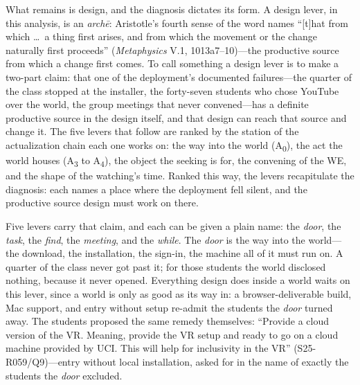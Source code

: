 What remains is design, and the diagnosis dictates its form. A design
lever, in this analysis, is an \textit{archē}: Aristotle's fourth
sense of the word names ``[t]hat from which \ldots\ a thing first
arises, and from which the movement or the change naturally first
proceeds'' (\textit{Metaphysics} V.1, 1013a7--10)---the productive
source from which a change first comes. To call something a design lever is to make a two-part claim: that one
of the deployment's documented failures---the quarter of the class
stopped at the installer, the forty-seven students who chose YouTube
over the world, the group meetings that never convened---has a definite
productive source in the design itself, and that design can reach that
source and change it. The five levers that follow are ranked by the
station of the actualization chain each one works on: the way into the
world (A\textsubscript{0}), the act the world houses (A\textsubscript{3}
to A\textsubscript{4}), the object the seeking is for, the convening of
the WE, and the shape of the watching's time. Ranked this way, the
levers recapitulate the diagnosis: each names a place where the
deployment fell silent, and the productive source design must work on
there.

Five levers carry that claim, and each can be given a plain name: the
\textit{door}, the \textit{task}, the \textit{find}, the
\textit{meeting}, and the \textit{while}. The \textit{door} is the way
into the world---the download, the installation, the sign-in, the
machine all of it must run on. A quarter of the class never got past
it; for those students the world disclosed nothing, because it never
opened. Everything design does inside a world waits on this lever,
since a world is only as good as its way in: a browser-deliverable
build, Mac support, and entry without setup re-admit the students the
\textit{door} turned away. The students proposed the same remedy
themselves: ``Provide a cloud version of the VR. Meaning, provide the VR
setup and ready to go on a cloud machine provided by UCI. This will help
for inclusivity in the VR'' (S25-R059/Q9)---entry without local
installation, asked for in the name of exactly the students the
\textit{door} excluded.

